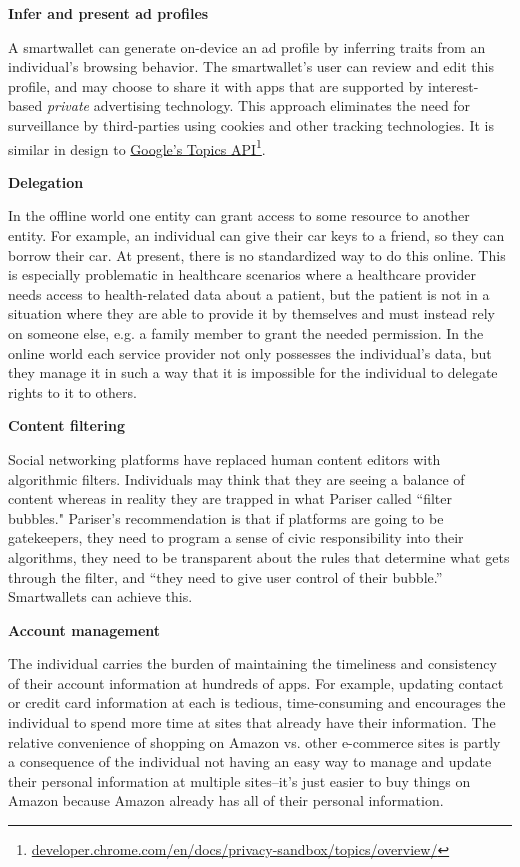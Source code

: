 \documentclass[11pt, oneside]{article}   	%
\newcommand{\hyperfootnote}[1][]{\def\ArgI{{#1}}\hyperfootnoteRelay}
\newcommand\hyperfootnoteRelay[2][]{\href{#1#2}{\ArgI}\footnote{\href{#1#2}{#2}}}
\begin{document}
\textbf{Infer and present ad profiles}

A smartwallet can generate on-device an ad profile by inferring traits from an individual's browsing behavior. The smartwallet's user can review and edit this profile, and may choose to share it with apps that are supported by interest-based \emph{private} advertising technology. This approach eliminates the need for surveillance by third-parties using cookies and other tracking technologies. It is similar in design to \hyperfootnote[Google's Topics API][https://]{developer.chrome.com/en/docs/privacy-sandbox/topics/overview/}.

\textbf{Delegation}

In the offline world one entity can grant access to some resource to another entity. For example, an individual can give their car keys to a friend, so they can borrow their car. At present, there is no standardized way to do this online. This is especially problematic in healthcare scenarios where a healthcare provider needs access to health-related data about a patient, but the patient is not in a situation where they are able to provide it by themselves and must instead rely on someone else, e.g. a family member to grant the needed permission. In the online world each service provider not only possesses the individual's data, but they manage it in such a way that it is impossible for the individual to delegate rights to it to others. 

\textbf{Content filtering}

Social networking platforms have replaced human content editors with algorithmic filters. Individuals may think that they are seeing a balance of content whereas in reality they are trapped in what Pariser called ``filter bubbles."\cite{Pariser2011} Pariser's recommendation is that if platforms are going to be gatekeepers, they need to program a sense of civic responsibility into their algorithms, they need to be transparent about the rules that determine what gets through the filter, and ``they need to give user control of their bubble.''\cite[p66]{McNamee2020} Smartwallets can achieve this.

\textbf{Account management} 

The individual carries the burden of maintaining the timeliness and consistency of their account information at hundreds of apps. For example, updating contact or credit card information at each is tedious, time-consuming and encourages the individual to spend more time at sites that already have their information. The relative convenience of shopping on Amazon vs. other e-commerce sites is partly a consequence of the individual not having an easy way to manage and update their personal information at multiple sites--it's just easier to buy things on Amazon because Amazon already has all of their personal information.
\end{document}
